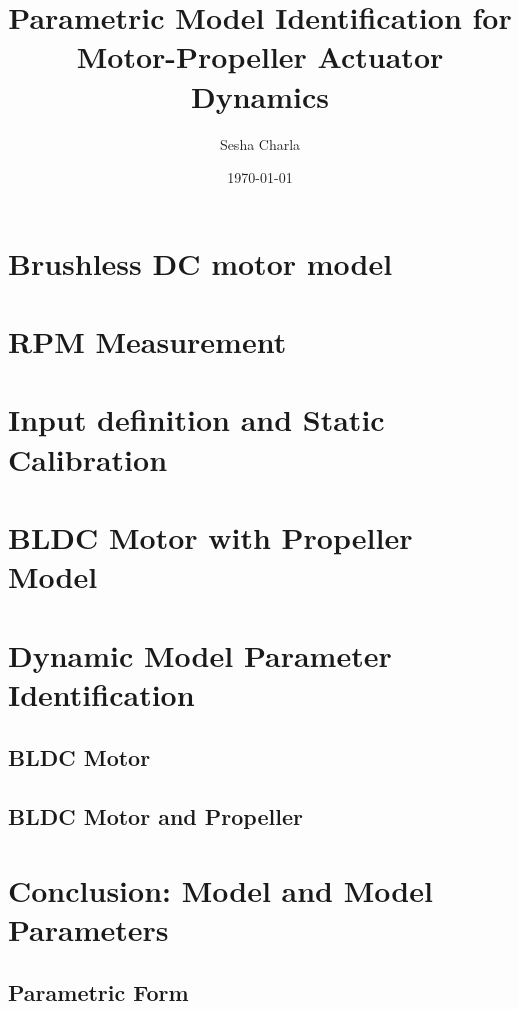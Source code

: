 \documentclass[letterpaper, 11pt]{article}
\title{Parametric Model Identification for Motor-Propeller Actuator Dynamics}
\author{Sesha Charla}
\date{\today}
\begin{document}
\maketitle
\tableofcontents
\newpage
\newpage
\newpage
\section{Brushless DC motor model}



\newpage
\section{RPM Measurement}

\newpage
\section{Input definition and Static Calibration}


\newpage
\section{BLDC Motor with Propeller Model}

\newpage
\section{Dynamic Model Parameter Identification}
\subsection{BLDC Motor}
\subsection{BLDC Motor and Propeller}
\newpage
\section{Conclusion: Model and Model Parameters}
\subsection{Parametric Form}
\newpage


\end{document}
